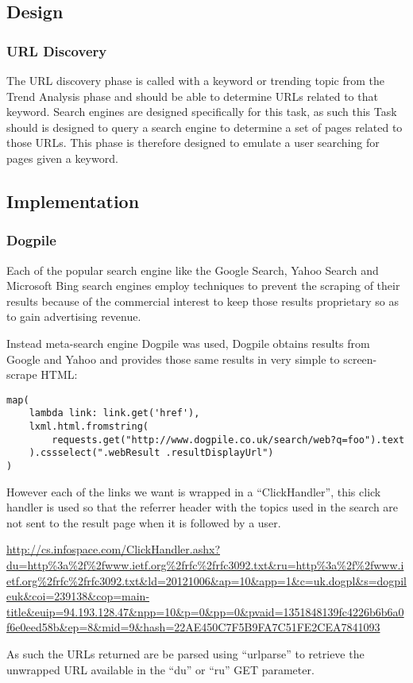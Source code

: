 \subsection{Design}
\subsubsection{URL Discovery}
The URL discovery phase is called with a keyword or trending topic from the Trend Analysis phase and should be able to determine URLs related to that keyword.  Search engines are designed specifically for this task, as such this Task should is designed to query a search engine to determine a set of pages related to those URLs. This phase is therefore designed to emulate a user searching for pages given a keyword.

\subsection{Implementation}
\subsubsection{Dogpile}
Each of the popular search engine like the Google Search, Yahoo Search and Microsoft Bing search engines employ techniques to prevent the scraping of their results because of the commercial interest to keep those results proprietary so as to gain advertising revenue.

Instead meta-search engine Dogpile was used, Dogpile obtains results from Google and Yahoo and provides those same results in very simple to screen-scrape HTML\cite{screen-scrape}:

\begin{verbatim}
map(
    lambda link: link.get('href'),
    lxml.html.fromstring(
        requests.get("http://www.dogpile.co.uk/search/web?q=foo").text
    ).cssselect(".webResult .resultDisplayUrl")
)
\end{verbatim}

However each of the links we want is wrapped in a ``ClickHandler'', this click handler is used so that the referrer header with the topics used in the search are not sent to the result page when it is followed by a user.

\url{http://cs.infospace.com/ClickHandler.ashx?du=http%
}

As such the URLs returned are be parsed using ``urlparse'' to retrieve the unwrapped URL available in the ``du'' or ``ru'' GET parameter\cite{rfc3092}.
